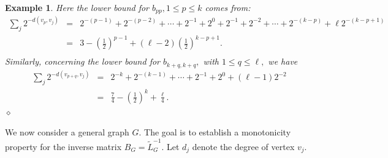 \documentclass[12pt]{article}
\newtheorem{example}{Example}
\begin{document}
\begin{example}
{%
Here the lower bound for $b_{pp}, 1\leq p\leq k$ comes from:
\begin{eqnarray*}    
\sum_j 2^{-d(v_p,v_j)}&= &
2^{-(p-1)}+ 2^{-(p-2)}+ \cdots+2^{-1}+2^0+ 2^{-1}+ 2^{-2}+ \cdots+ 2^{-(k-p)}+ \ell 2^{-(k-p+1)}\\
&=& 3-(\frac{1}{2})^{p-1}+ (\ell-2) \left(\frac{1}{2}\right)^{k-p+1}.\\
\end{eqnarray*}
Similarly, concerning the lower bound for $b_{k+q, k+q},$ with $1\leq q\leq \ell,$
we have 
\begin{eqnarray*}    
\sum_j 2^{-d(v_{p+q},v_j)}&= &
2^{-k}+ 2^{-(k-1)}+ \cdots+2^{-1}+2^0+ (\ell-1) 2^{-2}\\
&= & \frac{7}{4} -\left(\frac{1}{2}\right)^{k}+ \frac{\ell}{4}.
\end{eqnarray*}\hfill{$\diamond$}
}
    \end{example}


We now consider a general graph $G$. The goal is to establish a monotonicity property for the inverse matrix $B_G=\tilde{L}_G^{-1}$.  Let $d_j$ denote the degree of vertex $v_j$. 
\end{document}

